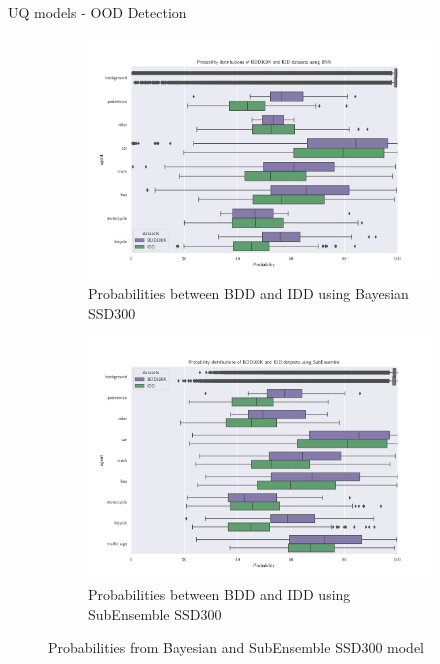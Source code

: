 \documentclass[10pt, aspectratio=169]{beamer}
\begin{document}
\begin{frame}[allowframebreaks]{UQ models - OOD Detection}
    \begin{figure}[H]
        \captionsetup[table]{skip=0pt}
            \centering
            \begin{subfigure}[t]{0.495\textwidth}
                \centering
                \includegraphics[width=\textwidth]{images/distributions/BNN_bdd_vs_iid_probabilities.png}
                \caption{Probabilities between BDD and IDD using Bayesian SSD300}
            \end{subfigure}
            \begin{subfigure}[t]{0.495\textwidth}
                \centering
                \includegraphics[width=\textwidth]{images/distributions/SubEns_bdd_vs_iid_probabilities.png}
                \caption{Probabilities between BDD and IDD using SubEnsemble SSD300}
            \end{subfigure}
            \caption{Probabilities from Bayesian and SubEnsemble SSD300 model }
    \end{figure}


\end{frame}
\end{document}
